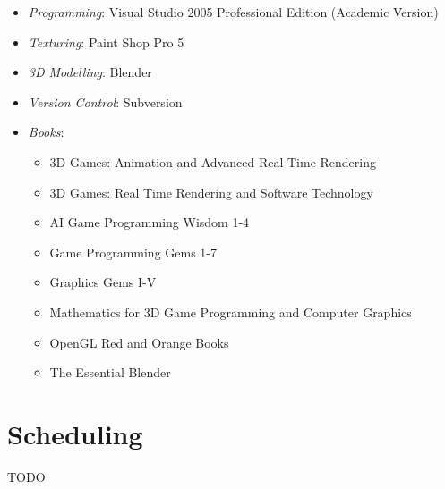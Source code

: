 \begin{center}
\begin{itemize}
\item \emph{Programming}: Visual Studio 2005 Professional Edition (Academic Version)
\item \emph{Texturing}: Paint Shop Pro 5
\item \emph{3D Modelling}: Blender
\item \emph{Version Control}: Subversion
\item \emph{Books}:
	\begin{itemize}
		\item 3D Games: Animation and Advanced Real-Time Rendering
		\item 3D Games: Real Time Rendering and Software Technology
		\item AI Game Programming Wisdom 1-4
		\item Game Programming Gems 1-7
		\item Graphics Gems I-V
		\item Mathematics for 3D Game Programming and Computer Graphics
		\item OpenGL Red and Orange Books
		\item The Essential Blender
	\end{itemize}
\end{itemize}
\end{center}

\section{Scheduling}

TODO
